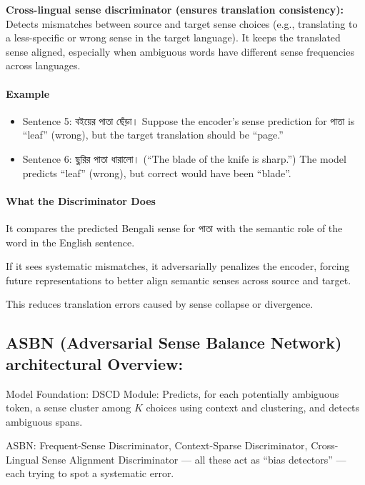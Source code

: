 \documentclass[a4paper,12pt]{article}
\begin{document}
\bigskip

\textbf{Cross-lingual sense discriminator (ensures translation consistency):} Detects mismatches between source and target sense choices (e.g., translating to a less-specific or wrong sense in the target language). It keeps the translated sense aligned, especially when ambiguous words have different sense frequencies across languages.

\paragraph{Example}

\begin{itemize}
    \item Sentence 5: \textbengali{বইয়ের পাতা ছেঁড়া।} Suppose the encoder’s sense prediction for \textbengali{পাতা} is “leaf” (wrong), but the target translation should be “page.”
    \item Sentence 6: \textbengali{ছুরির পাতা ধারালো।} (“The blade of the knife is sharp.”) The model predicts “leaf” (wrong), but correct would have been “blade”.
\end{itemize}

\paragraph{What the Discriminator Does}

It compares the predicted Bengali sense for \textbengali{পাতা} with the semantic role of the word in the English sentence.

If it sees systematic mismatches, it adversarially penalizes the encoder, forcing future representations to better align semantic senses across source and target.

This reduces translation errors caused by sense collapse or divergence.

\bigskip

\subsection*{ASBN (Adversarial Sense Balance Network) architectural Overview:}

Model Foundation: DSCD Module: Predicts, for each potentially ambiguous token, a sense cluster among $K$ choices using context and clustering, and detects ambiguous spans.

ASBN: Frequent-Sense Discriminator, Context-Sparse Discriminator, Cross-Lingual Sense Alignment Discriminator — all these act as ``bias detectors'' — each trying to spot a systematic error.
\end{document}
